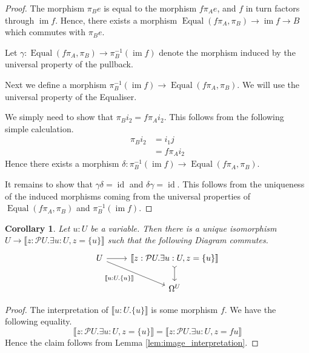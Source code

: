 \documentclass{birkjour}
\theoremstyle{plain}
\newtheorem{corollary}[thm]{Corollary}
\theoremstyle{definition}
\newcommand{\call}[1]{\mathcal{#1}}
\newcommand{\lto}{\longrightarrow}
\begin{document}
\begin{proof}
		The morphism $\pi_B e$ is equal to the morphism $f\pi_Ae$, and $f$ in turn factors through $\operatorname{im}f$. Hence, there exists a morphism $\operatorname{Equal}(f\pi_A,\pi_B) \lto \operatorname{im}f \lto B$ which commutes with $\pi_B e$.
		
		Let $\gamma: \operatorname{Equal}(f\pi_A,\pi_B) \lto \pi_B^{-1}(\operatorname{im}f)$ denote the morphism induced by the universal property of the pullback.
		
		Next we define a morphism $\pi_B^{-1}(\operatorname{im}f) \lto \operatorname{Equal}(f\pi_A,\pi_B)$. We will use the universal property of the Equaliser.
		
		We simply need to show that $\pi_Bi_2 = f\pi_Ai_2$.  This follows from the following simple calculation.
		\begin{align*}
			\pi_B i_2 &= i_1 j\\
			&= f\pi_Ai_2
		\end{align*}
		Hence there exists a morphism $\delta: \pi_B^{-1}(\operatorname{im}f) \lto \operatorname{Equal}(f\pi_A,\pi_B)$.
		
		It remains to show that $\gamma \delta = \operatorname{id}$ and $\delta \gamma = \operatorname{id}$. This follows from the uniqueness of the induced morphisms coming from the universal properties of $\operatorname{Equal}(f\pi_A,\pi_B)$ and $\pi_B^{-1}(\operatorname{im}f)$.
	\end{proof}
	\begin{corollary}\label{cor:embedded_subobject}
		Let $u:U$ be a variable. Then there is a unique isomorphism $U \lto \llbracket z: \call{P}U. \exists u:U, z = \lbrace u \rbrace \rrbracket$ such that the following Diagram commutes.
		\begin{equation}
			\begin{tikzcd}
				U\arrow[dr,swap,"{\llbracket u:U. \lbrace u \rbrace \rrbracket}"]\arrow[r] & \llbracket z: \call{P}U . \exists u :U, z = \lbrace u \rbrace \rrbracket\arrow[d,rightarrowtail]\\
				& \Omega^U
			\end{tikzcd}
		\end{equation}
	\end{corollary}
	\begin{proof}
		The interpretation of $\llbracket u:U. \lbrace u \rbrace \rrbracket$ is some morphism $f$. We have the following equality.
		\begin{equation}
			\llbracket z: \call{P}U. \exists u:U, z = \lbrace u \rbrace \rrbracket = \llbracket z : \call{P}U. \exists u : U, z = fu\rrbracket
		\end{equation}
		Hence the claim follows from Lemma \ref{lem:image_interpretation}.
	\end{proof}
\end{document}
